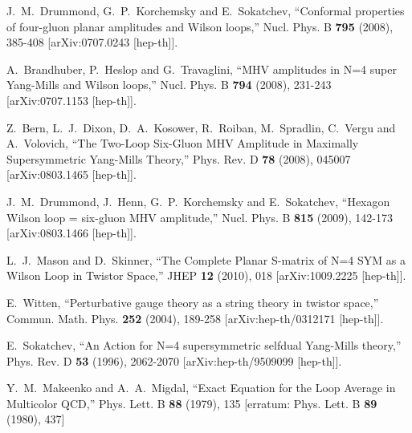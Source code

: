 \documentclass[12pt]{article}
\numberwithin{equation}{section}
\begin{document}
\begin{thebibliography}{}
J.~M.~Drummond, G.~P.~Korchemsky and E.~Sokatchev,
``Conformal properties of four-gluon planar amplitudes and Wilson loops,''
Nucl. Phys. B \textbf{795} (2008), 385-408
[arXiv:0707.0243 [hep-th]].

A.~Brandhuber, P.~Heslop and G.~Travaglini,
``MHV amplitudes in N=4 super Yang-Mills and Wilson loops,''
Nucl. Phys. B \textbf{794} (2008), 231-243
[arXiv:0707.1153 [hep-th]].

Z.~Bern, L.~J.~Dixon, D.~A.~Kosower, R.~Roiban, M.~Spradlin, C.~Vergu and A.~Volovich,
``The Two-Loop Six-Gluon MHV Amplitude in Maximally Supersymmetric Yang-Mills Theory,''
Phys. Rev. D \textbf{78} (2008), 045007
[arXiv:0803.1465 [hep-th]].

J.~M.~Drummond, J.~Henn, G.~P.~Korchemsky and E.~Sokatchev,
``Hexagon Wilson loop = six-gluon MHV amplitude,''
Nucl. Phys. B \textbf{815} (2009), 142-173
[arXiv:0803.1466 [hep-th]].

L.~J.~Mason and D.~Skinner,
``The Complete Planar S-matrix of N=4 SYM as a Wilson Loop in Twistor Space,''
JHEP \textbf{12} (2010), 018
[arXiv:1009.2225 [hep-th]].

E.~Witten,
``Perturbative gauge theory as a string theory in twistor space,''
Commun. Math. Phys. \textbf{252} (2004), 189-258
[arXiv:hep-th/0312171 [hep-th]].

E.~Sokatchev,
``An Action for N=4 supersymmetric selfdual Yang-Mills theory,''
Phys. Rev. D \textbf{53} (1996), 2062-2070
[arXiv:hep-th/9509099 [hep-th]].

Y.~M.~Makeenko and A.~A.~Migdal,
``Exact Equation for the Loop Average in Multicolor QCD,''
Phys. Lett. B \textbf{88} (1979), 135
[erratum: Phys. Lett. B \textbf{89} (1980), 437]


\end{thebibliography}
\end{document}

